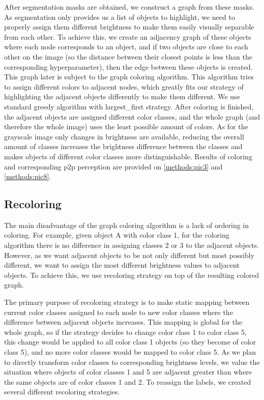 After segmentation masks are obtained, we construct a graph from these masks. As segmentation only provides us a list of objects to highlight, we need to properly assign them different brightness to make them easily visually separable from each other. To achieve this, we create an adjacency graph of these objects where each node corresponds to an object, and if two objects are close to each other on the image (so the distance between their closest points is less than the corresponding hyperparameter), then the edge between these objects is created. This graph later is subject to the graph coloring algorithm. This algorithm tries to assign different colors to adjacent nodes, which greatly fits our strategy of highlighting the adjacent objects differently to make them different. We use standard greedy algorithm \cite{kubale2004graph} with largest\_first strategy. After coloring is finished, the adjacent objects are assigned different color classes, and the whole graph (and therefore the whole image) uses the least possible amount of colors. As for the grayscale image only changes in brightness are available, reducing the overall amount of classes increases the brightness difference between the classes and makes objects of different color classes more distinguishable. Results of coloring and corresponding p2p perception are provided on \autoref{methods:pic3} and \autoref{methods:pic8}.

\subsection{Recoloring}
\label{methods:recoloring}

The main disadvantage of the graph coloring algorithm is a lack of ordering in coloring. For example, given object A with color class 1, for the coloring algorithm there is no difference in assigning classes 2 or 3 to the adjacent objects. However, as we want adjacent objects to be not only different but most possibly different, we want to assign the most different brightness values to adjacent objects. To achieve this, we use recoloring strategy on top of the resulting colored graph.

The primary purpose of recoloring strategy is to make static mapping between current color classes assigned to each node to new color classes where the difference between adjacent objects increases. This mapping is global for the whole graph, so if the strategy decides to change color class 1 to color class 5, this change would be applied to all color class 1 objects (so they become of color class 5), and no more color classes would be mapped to color class 5. As we plan to directly transform color classes to corresponding brightness levels, we value the situation where objects of color classes 1 and 5 are adjacent greater than where the same objects are of color classes 1 and 2. To reassign the labels, we created several different recoloring strategies.

